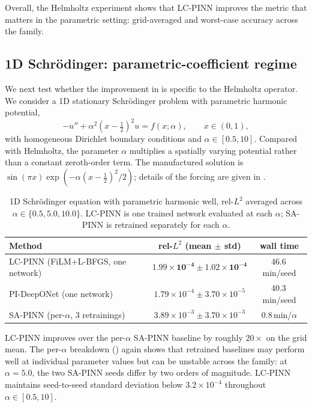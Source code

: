 \documentclass{article}
\theoremstyle{plain}
\theoremstyle{definition}
\theoremstyle{remark}
\begin{document}
Overall, the Helmholtz experiment shows that LC-PINN improves the
metric that matters in the parametric setting: grid-averaged and
worst-case accuracy across the family.

\subsection{1D Schrödinger: parametric-coefficient regime}
\label{sec:results-schrodinger}

We next test whether the improvement in 
is specific to the Helmholtz operator. We consider a 1D stationary
Schrödinger problem with parametric harmonic potential,
\[
    -u'' + \alpha^2(x-\tfrac12)^2 u = f(x;\alpha),
    \qquad x \in (0,1),
\]
with homogeneous Dirichlet boundary conditions and
$\alpha \in [0.5,10]$. Compared with Helmholtz, the parameter
$\alpha$ multiplies a spatially varying potential rather than a
constant zeroth-order term. The manufactured solution is
$\sin(\pi x)\exp(-\alpha(x-\tfrac12)^2/2)$; details of the forcing are
given in .

\begin{table}[!t]
\centering
\caption{1D Schrödinger equation with parametric harmonic well,
rel-$L^2$ averaged across $\alpha \in \{0.5,5.0,10.0\}$. LC-PINN is
one trained network evaluated at each $\alpha$; SA-PINN is retrained
separately for each $\alpha$.}
\label{tab:schrodinger}
\small
\begin{tabular}{lcc}
\toprule
Method & rel-$L^2$ (mean $\pm$ std) & wall time \\
\midrule
LC-PINN (FiLM+L-BFGS, one network)        & $\mathbf{1.99 \times 10^{-4} \pm 1.02 \times 10^{-4}}$ & 46.6\,min/seed \\
PI-DeepONet (one network)                 & $1.79 \times 10^{-4} \pm 3.70 \times 10^{-5}$        & 40.3\,min/seed \\
SA-PINN (per-$\alpha$, 3 retrainings)     & $3.89 \times 10^{-3} \pm 3.70 \times 10^{-3}$ & 0.8\,min/$\alpha$ \\
\bottomrule
\end{tabular}
\end{table}

LC-PINN improves over the per-$\alpha$ SA-PINN baseline by roughly
$20\times$ on the grid mean. The per-$\alpha$ breakdown
() again shows that retrained baselines may
perform well at individual parameter values but can be unstable across
the family: at $\alpha=5.0$, the two SA-PINN seeds differ by two
orders of magnitude. LC-PINN maintains seed-to-seed standard deviation
below $3.2\times10^{-4}$ throughout $\alpha \in [0.5,10]$.
\end{document}
